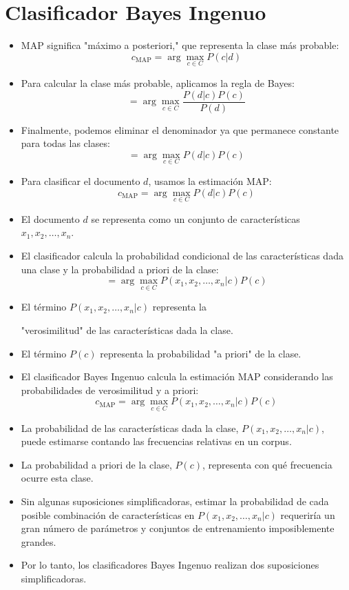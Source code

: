 \section{Clasificador Bayes Ingenuo}
\begin{itemize}
    \item MAP significa "máximo a posteriori," que representa la clase más probable:
    \[
    c_{\text{MAP}} = \arg\max_{c \in C} P(c | d)
    \]
    \item Para calcular la clase más probable, aplicamos la regla de Bayes:
    \[
    = \arg\max_{c \in C} \frac{P(d | c)P(c)}{P(d)}
    \]
    \item Finalmente, podemos eliminar el denominador ya que permanece constante para todas las clases:
    \[
    = \arg\max_{c \in C} P(d | c)P(c)
    \]
    \item Para clasificar el documento $d$, usamos la estimación MAP:
    \[
    c_{\text{MAP}} = \arg\max_{c \in C} P(d | c)P(c)
    \]
    \item El documento $d$ se representa como un conjunto de características $x_1, x_2, \ldots, x_n$.
    \item El clasificador calcula la probabilidad condicional de las características dada una clase y la probabilidad a priori de la clase:
    \[
    = \arg\max_{c \in C} P(x_1, x_2, \ldots, x_n | c)P(c)
    \]
    \item El término $P(x_1, x_2, \ldots, x_n | c)$ representa la

 "verosimilitud" de las características dada la clase.
    \item El término $P(c)$ representa la probabilidad "a priori" de la clase.
    \item El clasificador Bayes Ingenuo \cite{mccallum1998comparison} calcula la estimación MAP considerando las probabilidades de verosimilitud y a priori:
    \[
    c_{\text{MAP}} = \arg\max_{c \in C} P(x_1, x_2, \ldots, x_n | c)P(c)
    \]
    \item La probabilidad de las características dada la clase, $P(x_1, x_2, \ldots, x_n | c)$, puede estimarse contando las frecuencias relativas en un corpus.
    \item La probabilidad a priori de la clase, $P(c)$, representa con qué frecuencia ocurre esta clase.
    \item Sin algunas suposiciones simplificadoras, estimar la probabilidad de cada posible combinación de características en $P(x_1, x_2, \ldots, x_n | c)$ requeriría un gran número de parámetros y conjuntos de entrenamiento imposiblemente grandes.
    \item Por lo tanto, los clasificadores Bayes Ingenuo realizan dos suposiciones simplificadoras.
\end{itemize}


